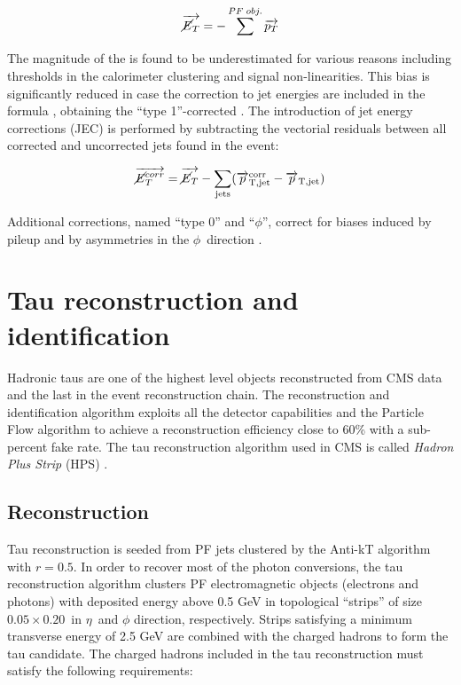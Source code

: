 \begin{equation}
\vec{\cancel{E}_T} = -\sum^{PF\;obj.} \vec{p_{T}}
\end{equation}

The magnitude of the \MET is found to be underestimated for various reasons including thresholds in the calorimeter clustering and signal non-linearities. This bias is significantly reduced in case the correction to jet energies are included in the formula \cite{Chatrchyan:2011ds}, obtaining the ``type 1''-corrected \MET. The introduction of jet energy corrections (JEC) is performed by subtracting the vectorial residuals between all corrected and uncorrected jets found in the event:

\begin{equation}
\vec{\cancel{E}_T^{corr}} = \vec{\cancel{E}_T } - \sum_\mathrm{jets} (\vec{p}_\mathrm{T,jet}^\mathrm{corr}-\vec{p}_\mathrm{T,jet})
\label{eq:Type1MET}
\end{equation}

Additional corrections, named ``type 0'' and ``$\phi$'', correct for biases induced by pileup and by asymmetries in the $\phi$\ direction \cite{AN-13-233}.

\section{Tau reconstruction and identification}
\label{sec:tau_id}

Hadronic taus are one of the highest level objects reconstructed from CMS data and the last in the event reconstruction chain. The reconstruction and identification algorithm exploits all the detector capabilities and the Particle Flow algorithm to achieve a reconstruction efficiency close to 60\% with a sub-percent fake rate. The tau reconstruction algorithm used in CMS is called \emph{Hadron Plus Strip} (HPS) \cite{CMS-PAS-TAU-11-001,AN-14-008}. 

\subsection{Reconstruction}

Tau reconstruction is seeded from PF jets clustered by the Anti-kT algorithm with $r = 0.5$. In order to recover most of the photon conversions, the tau reconstruction algorithm clusters PF electromagnetic objects (electrons and photons) with deposited energy above 0.5 GeV in topological ``strips'' of size $0.05 \times 0.20$\ in $\eta$\ and $\phi$ direction, respectively. Strips satisfying a minimum transverse energy of 2.5 GeV are combined with the charged hadrons to form the tau candidate. The charged hadrons included in the tau reconstruction must satisfy the following requirements:

